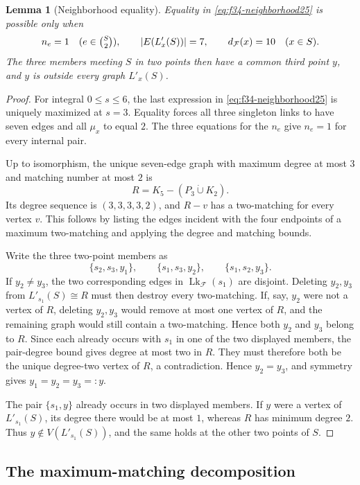 \documentclass[11pt]{article}
\numberwithin{equation}{section}
\newtheorem{lemma}[lemma]{Lemma}
\theoremstyle{definition}
\theoremstyle{remark}
\newcommand{\F}{\mathcal F}
\newcommand{\Lk}{\operatorname{Lk}}
\begin{document}
\begin{lemma}[Neighborhood equality]
\label{lem:f34-rigidity}
Equality in \cref{eq:f34-neighborhood25} is possible only when
\[
 n_e=1\quad(e\in\tbinom S2),
 \qquad
 |E(L'_x(S))|=7,
 \qquad
 d_{\F}(x)=10\quad(x\in S).
\]
The three members meeting $S$ in two points then have a common third point
$y$, and $y$ is outside every graph $L'_x(S)$.
\end{lemma}

\begin{proof}
For integral $0\le s\le6$, the last expression in
\cref{eq:f34-neighborhood25} is uniquely maximized at $s=3$. Equality forces
all three singleton links to have seven edges and all $\mu_x$ to equal $2$.
The three equations for the $n_e$ give $n_e=1$ for every internal pair.

Up to isomorphism, the unique seven-edge graph with maximum degree at most
$3$ and matching number at most $2$ is
\[
 R=K_5-(P_3\mathbin{\dot\cup}K_2).
\]
Its degree sequence is $(3,3,3,3,2)$, and $R-v$ has a two-matching for every
vertex $v$. This follows by listing the edges incident with the four
endpoints of a maximum two-matching and applying the degree and matching
bounds.

Write the three two-point members as
\[
 \{s_2,s_3,y_1\},\qquad
 \{s_1,s_3,y_2\},\qquad
 \{s_1,s_2,y_3\}.
\]
If $y_2\ne y_3$, the two corresponding edges in $\Lk_{\F}(s_1)$ are
disjoint. Deleting $y_2,y_3$ from $L'_{s_1}(S)\cong R$ must then destroy
every two-matching. If, say, $y_2$ were not a vertex of $R$, deleting
$y_2,y_3$ would remove at most one vertex of $R$, and the remaining graph
would still contain a two-matching. Hence both $y_2$ and $y_3$ belong to
$R$. Since each already occurs with $s_1$ in one of the two displayed
members, the pair-degree bound gives degree at most two in $R$. They must
therefore both be the unique degree-two vertex of $R$, a contradiction.
Hence $y_2=y_3$, and symmetry gives $y_1=y_2=y_3=:y$.

The pair $\{s_1,y\}$ already occurs in two displayed members. If $y$ were a
vertex of $L'_{s_1}(S)$, its degree there would be at most $1$, whereas $R$
has minimum degree $2$. Thus $y\notin V(L'_{s_1}(S))$, and the same holds at
the other two points of $S$.
\end{proof}

\subsection{The maximum-matching decomposition}
\end{document}
